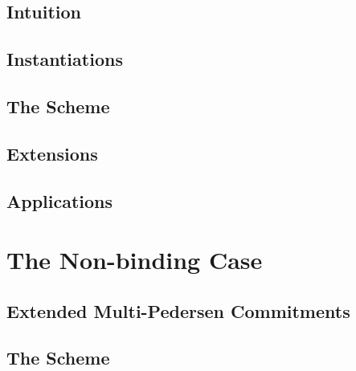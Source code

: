         

        \subsection{Intuition} \label{sec:bits-intuition}

             

        \subsection{Instantiations} \label{sec:bits-instantiations}

            

        \subsection{The Scheme} \label{sec:bits-scheme}

            

        \subsection{Extensions} \label{sec:bits-extensions}

            

        \subsection{Applications} \label{sec:bits-applications}

            

    \section{The Non-binding Case} \label{sec:bits-non-binding}

        

        \subsection{Extended Multi-Pedersen Commitments} \label{sec:ext-mp}

            

        \subsection{The Scheme} \label{sec:bits-scheme-nb}

